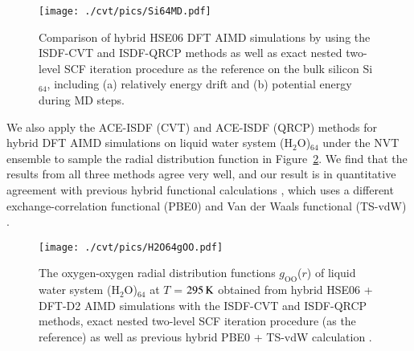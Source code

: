 \begin{figure}[htbp]
	\begin{center}
		\texttt{[image: ./cvt/pics/Si64MD.pdf]}
	\end{center}
	\caption{Comparison of hybrid HSE06 DFT AIMD simulations by using
	the ISDF-CVT and ISDF-QRCP methods as well as exact nested two-level
	SCF iteration procedure as the reference on the bulk silicon
	Si$_{64}$, including (a) relatively energy drift and (b) potential
	energy during MD steps.} \label{fig:Si64MD}
\end{figure}
\FloatBarrier

We also apply the ACE-ISDF (CVT) and ACE-ISDF (QRCP) methods for hybrid DFT AIMD
simulations on liquid water system (H$_2$O)$_{64}$ under the NVT ensemble to
sample the radial distribution function in Figure~\ref{fig:H2O64gOO}. We find
that the results from all three methods agree very well, and our result is in
quantitative agreement with previous hybrid functional calculations
\cite{JCP_141_084502_2014}, which uses a different exchange-correlation
functional (PBE0) and Van der Waals functional (TS-vdW) 
\cite{PRL_102_073005_2009}.

\begin{figure}[htbp]
	\begin{center}
		\texttt{[image: ./cvt/pics/H2O64gOO.pdf]}
	\end{center}
	\caption{The oxygen-oxygen radial distribution functions $g_\text{OO}$($r$) of
	liquid water system (H$_2$O)$_{64}$ at $T$ = $295\operatorname{K}$ obtained from hybrid
	HSE06 + DFT-D2 AIMD simulations with the ISDF-CVT and ISDF-QRCP methods, exact
	nested two-level SCF iteration procedure (as the reference) as well as
	previous hybrid PBE0 + TS-vdW calculation \cite{JCP_141_084502_2014}.}
	\label{fig:H2O64gOO}
\end{figure}
\FloatBarrier

